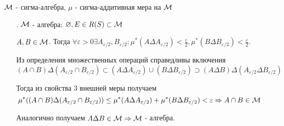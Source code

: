 \par \Th $\mathcal{M}$ - сигма-алгебра, $\mu$ - сигма-аддитивная мера на $\mathcal{M}$
\par \begin{itemize}
    \item[\Proof 1.] $\mathcal{M}$ - алгебра: $\varnothing, E \in R(S) \subset \mathcal{M}$
    \par $A, B \in \mathcal{M}$. Тогда $\forall \varepsilon > 0 \exists A_{\varepsilon/2}, B_{\varepsilon/2}: \mu^*(A \Delta A_{\varepsilon/2})<\frac{\varepsilon}{2}, \mu^*(B \Delta B_{\varepsilon / 2}) < \frac{\varepsilon}{2}$.
    \par Из определения множественных операций справедливы включения
    $$(A \cap B) \Delta (A_{\varepsilon/2} \cap B_{\varepsilon/2}) \subset (A \Delta A_{\varepsilon/2}) \cup (B \Delta B_{\varepsilon/2}) \supset (A \Delta B) \Delta (A_{\varepsilon/2} \Delta B_{\varepsilon/2})$$
    \par Тогда из свойства 3 внешней меры получаем
    $$\mu^*((A \cap B) \Delta (A_{\varepsilon/2} \cap B_{\varepsilon/2})) \leq \mu^*(A \Delta A_{\varepsilon/2})+\mu^*(B \Delta B_{\varepsilon/2}) < \varepsilon \Rightarrow A \cap B \in \mathcal{M}$$
    \par Аналогично получаем $A \Delta B \in \mathcal{M} \Rightarrow \mathcal{M}$ - алгебра.
    

\end{itemize}

